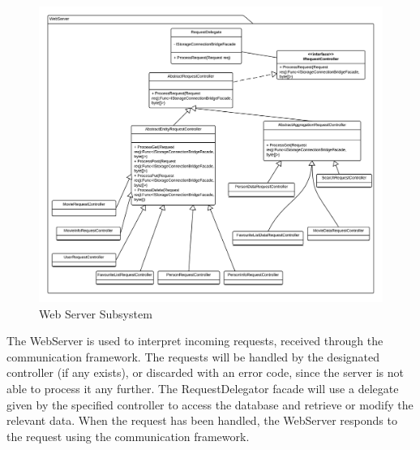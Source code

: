 \begin{figure}[H]
\includegraphics[width=\linewidth]{img/SDD/WebserverSubsystem.png}
\caption{Web Server Subsystem}
\label{fig:WebServer}
\end{figure}
The WebServer is used to interpret incoming requests, received through the communication framework. The requests will be handled by the designated controller (if any exists), or discarded with an error code, since the server is not able to process it any further.
The RequestDelegator facade will use a delegate given by the specified controller to access the database and retrieve or modify the relevant data. When the request has been handled, the WebServer responds to the request using the communication framework.

